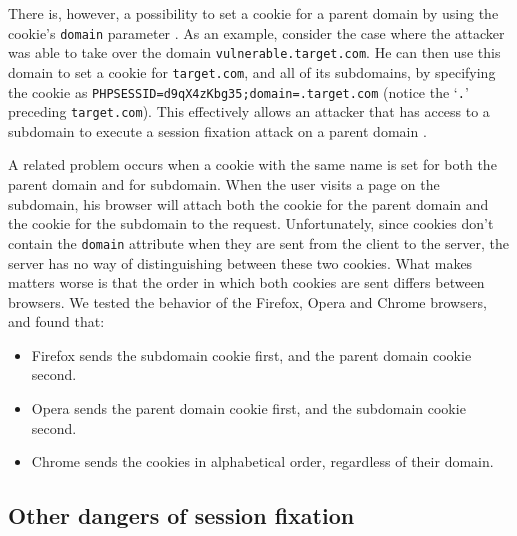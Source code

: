 There is, however, a possibility to set a cookie for a parent domain by using the cookie's \texttt{domain} parameter \cite{rfc2109}. As an example, consider the case where the attacker was able to take over the domain \texttt{vulnerable.target.com}. He can then use this domain to set a cookie for \texttt{target.com}, and all of its subdomains, by specifying the cookie as \texttt{PHPSESSID=d9qX4zKbg35;domain=.target.com} (notice the `\texttt{.}' preceding \texttt{target.com}). This effectively allows an attacker that has access to a subdomain to execute a session fixation attack on a parent domain \cite{Kolsek2002}.

A related problem occurs when a cookie with the same name is set for both the parent domain and for subdomain. When the user visits a page on the subdomain, his browser will attach both the cookie for the parent domain and the cookie for the subdomain to the request. Unfortunately, since cookies don't contain the \texttt{domain} attribute when they are sent from the client to the server, the server has no way of distinguishing between these two cookies. What makes matters worse is that the order in which both cookies are sent differs between browsers. We tested the behavior of the Firefox, Opera and Chrome browsers, and found that:
\begin{itemize}
	\item Firefox sends the subdomain cookie first, and the parent domain cookie second.
	\item Opera sends the parent domain cookie first, and the subdomain cookie second.
	\item Chrome sends the cookies in alphabetical order, regardless of their domain.
\end{itemize}

\subsection{Other dangers of session fixation}

